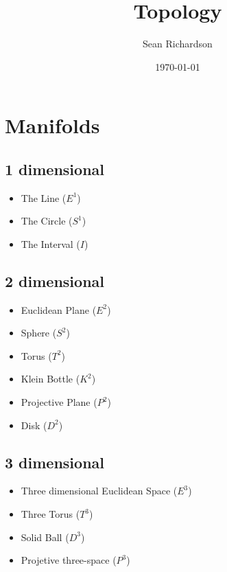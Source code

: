 \documentclass{article}[12pt]
\theoremstyle{definition}
\begin{document}
\title{Topology}
\author{Sean Richardson}
\date{\today}
\maketitle

\section{Manifolds}
\subsection{1 dimensional}
\begin{itemize}
    \item The Line ($E^1$)
    \item The Circle ($S^1$)
    \item The Interval ($I$)
\end{itemize}
\subsection{2 dimensional}
\begin{itemize}
    \item Euclidean Plane ($E^2$)
    \item Sphere ($S^2$)
    \item Torus ($T^2$)
    \item Klein Bottle ($K^2$)
    \item Projective Plane ($P^2$)
    \item Disk ($D^2$)

\end{itemize}

\subsection{3 dimensional}
\begin{itemize}
    \item Three dimensional Euclidean Space ($E^3$)
    \item Three Torus ($T^3$)
    \item Solid Ball ($D^3$)
    \item Projetive three-space ($P^3$)
\end{itemize}
\end{document}

